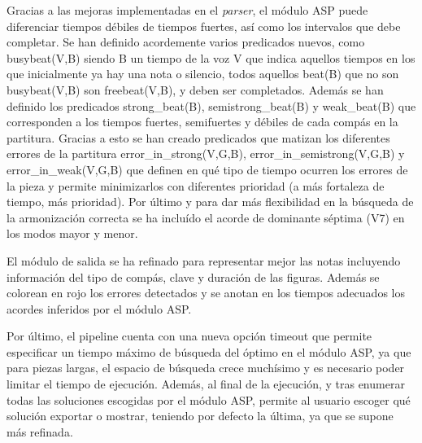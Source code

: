 Gracias a las mejoras implementadas en el \textit{parser}, el módulo ASP puede diferenciar tiempos débiles de tiempos fuertes, así como los intervalos que debe completar. Se han definido acordemente varios predicados nuevos, como busybeat(V,B) siendo B un tiempo de la voz V que indica aquellos tiempos en los que inicialmente ya hay una nota o silencio, todos aquellos beat(B) que no son busybeat(V,B) son freebeat(V,B), y deben ser completados. Además se han definido los predicados strong_beat(B), semistrong_beat(B) y weak_beat(B) que corresponden a los tiempos fuertes, semifuertes y débiles de cada compás en la partitura. Gracias a esto se han creado predicados que matizan los diferentes errores de la partitura error_in_strong(V,G,B), error_in_semistrong(V,G,B) y error_in_weak(V,G,B) que definen en qué tipo de tiempo ocurren los errores de la pieza y permite minimizarlos con diferentes prioridad (a más fortaleza de tiempo, más prioridad). Por último y para dar más flexibilidad en la búsqueda de la armonización correcta se ha incluído el acorde de dominante séptima (V7) en los modos mayor y menor.

El módulo de salida se ha refinado para representar mejor las notas incluyendo información del tipo de compás, clave y duración de las figuras. Además se colorean en rojo los errores detectados y se anotan en los tiempos adecuados los acordes inferidos por el módulo ASP.

Por último, el pipeline cuenta con una nueva opción timeout que permite especificar un tiempo máximo de búsqueda del óptimo en el módulo ASP, ya que para piezas largas, el espacio de búsqueda crece muchísimo y es necesario poder limitar el tiempo de ejecución. Además, al final de la ejecución, y tras enumerar todas las soluciones escogidas por el módulo ASP, permite al usuario escoger qué solución exportar o mostrar, teniendo por defecto la última, ya que se supone más refinada.